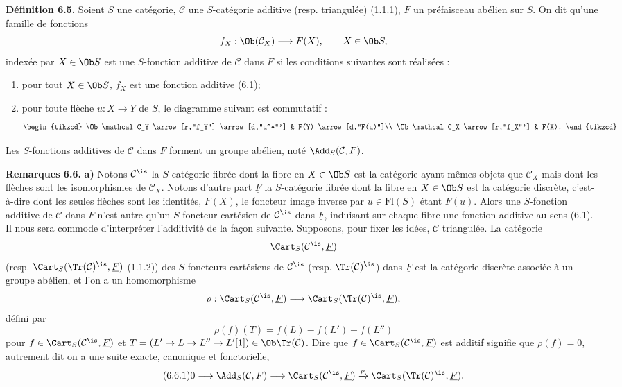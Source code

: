 \documentclass[11pt]{article}
\begin{document}
\textbf{Définition 6.5.} Soient \(S\) une catégorie, \(\mathcal C\) une \(S\)-catégorie additive (resp. triangulée) (1.1.1), \(F\) un préfaisceau abélien sur \(S\). On dit qu'une famille de fonctions
\[
  f_X:\Ob(\mathcal C_X)\longrightarrow F(X),
  \qquad X\in\Ob S,
\]
indexée par \(X\in\Ob S\) est une \(S\)-fonction additive de \(\mathcal C\) dans \(F\) si les conditions suivantes sont réalisées :
\begin{enumerate}[label=(\roman*)]
\item pour tout \(X\in\Ob S\), \(f_X\) est une fonction additive (6.1);
\item pour toute flèche \(u:X\to Y\) de \(S\), le diagramme suivant est commutatif :
\[
\begin{tikzcd}
\Ob\mathcal C_Y \arrow[r,"f_Y"] \arrow[d,"u^*"'] & F(Y) \arrow[d,"F(u)"]\\
\Ob\mathcal C_X \arrow[r,"f_X"'] & F(X).
\end{tikzcd}
\]
\end{enumerate}
Les \(S\)-fonctions additives de \(\mathcal C\) dans \(F\) forment un groupe abélien, noté \(\Add_S(\mathcal C,F)\).

\textbf{Remarques 6.6.} \textbf{a)} Notons \(\mathcal C^{\is}\) la \(S\)-catégorie fibrée dont la fibre en \(X\in\Ob S\) est la catégorie ayant mêmes objets que \(\mathcal C_X\) mais dont les flèches sont les isomorphismes de \(\mathcal C_X\). Notons d'autre part \(\underline F\) la \(S\)-catégorie fibrée dont la fibre en \(X\in\Ob S\) est la catégorie discrète, c'est-à-dire dont les seules flèches sont les identités, \(F(X)\), le foncteur image inverse par \(u\in\mathrm{Fl}(S)\) étant \(F(u)\). Alors une \(S\)-fonction additive de \(\mathcal C\) dans \(F\) n'est autre qu'un \(S\)-foncteur cartésien de \(\mathcal C^{\is}\) dans \(\underline F\), induisant sur chaque fibre une fonction additive au sens (6.1). Il nous sera commode d'interpréter l'additivité de la façon suivante. Supposons, pour fixer les idées, \(\mathcal C\) triangulée. La catégorie
\[
  \Cart_S(\mathcal C^{\is},\underline F)
\]
(resp. \(\Cart_S(\Tr(\mathcal C)^{\is},\underline F)\) (1.1.2)) des \(S\)-foncteurs cartésiens de \(\mathcal C^{\is}\) (resp. \(\Tr(\mathcal C)^{\is}\)) dans \(\underline F\) est la catégorie discrète associée à un groupe abélien, et l'on a un homomorphisme
\[
  \rho:\Cart_S(\mathcal C^{\is},\underline F)
  \longrightarrow
  \Cart_S(\Tr(\mathcal C)^{\is},\underline F),
\]
défini par
\[
  \rho(f)(T)=f(L)-f(L')-f(L'')
\]
pour \(f\in\Cart_S(\mathcal C^{\is},\underline F)\) et \(T=(L'\to L\to L''\to L'[1])\in\Ob\Tr(\mathcal C)\). Dire que \(f\in\Cart_S(\mathcal C^{\is},\underline F)\) est additif signifie que \(\rho(f)=0\), autrement dit on a une suite exacte, canonique et fonctorielle,
\begin{equation}\tag{6.6.1}
  0\longrightarrow \Add_S(\mathcal C,F)
  \longrightarrow \Cart_S(\mathcal C^{\is},\underline F)
  \xrightarrow{\rho}
  \Cart_S(\Tr(\mathcal C)^{\is},\underline F).
\end{equation}
\end{document}
